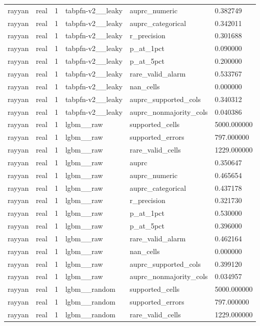 \begin{tabular}{llllll}
rayyan & real & 1 & tabpfn-v2\_\_leaky & auprc\_numeric & 0.382749 \\
rayyan & real & 1 & tabpfn-v2\_\_leaky & auprc\_categorical & 0.342011 \\
rayyan & real & 1 & tabpfn-v2\_\_leaky & r\_precision & 0.301688 \\
rayyan & real & 1 & tabpfn-v2\_\_leaky & p\_at\_1pct & 0.090000 \\
rayyan & real & 1 & tabpfn-v2\_\_leaky & p\_at\_5pct & 0.200000 \\
rayyan & real & 1 & tabpfn-v2\_\_leaky & rare\_valid\_alarm & 0.533767 \\
rayyan & real & 1 & tabpfn-v2\_\_leaky & nan\_cells & 0.000000 \\
rayyan & real & 1 & tabpfn-v2\_\_leaky & auprc\_supported\_cols & 0.340312 \\
rayyan & real & 1 & tabpfn-v2\_\_leaky & auprc\_nonmajority\_cols & 0.040386 \\
rayyan & real & 1 & lgbm\_\_raw & supported\_cells & 5000.000000 \\
rayyan & real & 1 & lgbm\_\_raw & supported\_errors & 797.000000 \\
rayyan & real & 1 & lgbm\_\_raw & rare\_valid\_cells & 1229.000000 \\
rayyan & real & 1 & lgbm\_\_raw & auprc & 0.350647 \\
rayyan & real & 1 & lgbm\_\_raw & auprc\_numeric & 0.465654 \\
rayyan & real & 1 & lgbm\_\_raw & auprc\_categorical & 0.437178 \\
rayyan & real & 1 & lgbm\_\_raw & r\_precision & 0.321730 \\
rayyan & real & 1 & lgbm\_\_raw & p\_at\_1pct & 0.530000 \\
rayyan & real & 1 & lgbm\_\_raw & p\_at\_5pct & 0.396000 \\
rayyan & real & 1 & lgbm\_\_raw & rare\_valid\_alarm & 0.462164 \\
rayyan & real & 1 & lgbm\_\_raw & nan\_cells & 0.000000 \\
rayyan & real & 1 & lgbm\_\_raw & auprc\_supported\_cols & 0.399120 \\
rayyan & real & 1 & lgbm\_\_raw & auprc\_nonmajority\_cols & 0.034957 \\
rayyan & real & 1 & lgbm\_\_random & supported\_cells & 5000.000000 \\
rayyan & real & 1 & lgbm\_\_random & supported\_errors & 797.000000 \\
rayyan & real & 1 & lgbm\_\_random & rare\_valid\_cells & 1229.000000 \\

\end{tabular}
